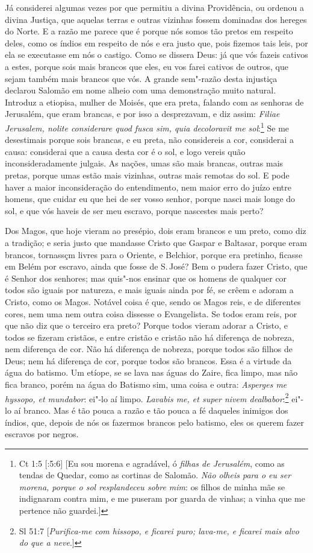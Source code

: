 Já considerei algumas vezes por que permitiu a divina Providência, ou
ordenou a divina Justiça, que aquelas terras e outras vizinhas fossem
dominadas dos hereges do Norte. E a razão me parece que é porque nós
somos tão pretos em respeito deles, como os índios em respeito de nós e
era justo que, pois fizemos tais leis, por ela se executasse em nós o
castigo. Como se dissera Deus: já que vós fazeis cativos a estes, porque
sois mais brancos que eles, eu vos farei cativos de outros, que sejam
também mais brancos que vós. A grande sem"-razão desta injustiça declarou
Salomão em nome alheio com uma demonstração muito natural. Introduz a
etiopisa, mulher de Moisés, que era preta, falando com as senhoras de
Jerusalém, que eram brancas, e por isso a desprezavam, e diz assim:
\emph{Filiae Jerusalem, nolite considerare quod fusca sim, quia
decoloravit me sol}:\footnote{Ct 1:5 [:5:6] [Eu sou morena e agradável, ó \emph{filhas de Jerusalém}, como as tendas de Quedar, como as cortinas de Salomão. \emph{Não olheis para o eu ser morena, porque o sol resplandeceu sobre mim}: os filhos de minha mãe se indignaram contra mim, e me puseram por guarda de vinhas; a vinha que me pertence não guardei.]} Se me desestimais porque sois brancas, e eu
preta, não considereis a cor, considerai a causa: considerai que a causa
desta cor é o sol, e logo vereis quão inconsideradamente julgais. As
nações, umas são mais brancas, outras mais pretas, porque umas estão
mais vizinhas, outras mais remotas do sol. E pode haver a maior
inconsideração do entendimento, nem maior erro do juízo entre homens,
que cuidar eu que hei de ser vosso senhor, porque nasci mais longe do
sol, e que vós haveis de ser meu escravo, porque nascestes mais perto?

Dos Magos, que hoje vieram ao presépio, dois eram brancos e um preto,
como diz a tradição; e seria justo que mandasse Cristo que Gaspar e
Baltasar, porque eram brancos, tornassçm livres para o Oriente, e
Belchior, porque era pretinho, ficasse em Belém por escravo, ainda que
fosse de S.\,José? Bem o pudera fazer Cristo, que é Senhor dos senhores;
mas quis"-nos ensinar que os homens de qualquer cor todos são iguais por
natureza, e mais iguais ainda por fé, se crêem e adoram a Cristo, como
os Magos. Notável coisa é que, sendo os Magos reis, e de diferentes
cores, nem uma nem outra coisa dissesse o Evangelista. Se todos eram
reis, por que não diz que o terceiro era preto? Porque todos vieram
adorar a Cristo, e todos se fizeram cristãos, e entre cristão e cristão
não há diferença de nobreza, nem diferença de cor. Não há diferença de
nobreza, porque todos são filhos de Deus; nem há diferença de cor,
porque todos são brancos. Essa é a virtude da água do batismo. Um
etíope, se se lava nas águas do Zaire, fica limpo, mas não fica branco,
porém na água do Batismo sim, uma coisa e outra: \emph{Asperges me
hyssopo, et mundabor}: ei"-lo aí limpo. \emph{Lavabis me,
et super nivem dealbabor}:\footnote{Sl 51:7 [\emph{Purifica-me com hissopo, e ficarei puro; lava-me, e ficarei mais alvo do que a neve}.]} ei"-lo aí branco. Mas é tão pouca
a razão e tão pouca a fé daqueles inimigos dos índios, que, depois de
nós os fazermos brancos pelo batismo, eles os querem fazer escravos por
negros.

